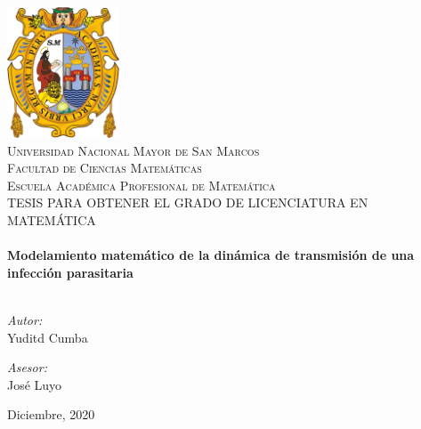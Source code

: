 \begin{titlepage}
\vbox{ }

\vbox{ }

\begin{center}
\includegraphics[width=0.25\textwidth]{img/logoUNMSM.jpg}\\[1cm]
\textsc{\LARGE Universidad Nacional Mayor de San Marcos}\\[1.5cm]
\textsc{\LARGE Facultad de Ciencias Matemáticas}\\[0.5cm]
\textsc{\LARGE Escuela Académica Profesional de Matemática}\\[1.5cm]
\textsc{\Large TESIS PARA OBTENER EL GRADO DE LICENCIATURA EN MATEMÁTICA}\\[0.5cm]

\vbox{ }
\HRule \\[0.4cm]
{ \huge \bfseries Modelamiento matem\'atico de la din\'amica de transmisi\'on de una infecci\'on parasitaria}\\[0.4cm]
\HRule \\[1.5cm]
\begin{minipage}{0.4\textwidth}
\begin{flushleft} \large
\emph{Autor: }\\
Yuditd Cumba
\end{flushleft}
\end{minipage}
\begin{minipage}{0.4\textwidth}
\begin{flushright} \large
\emph{Asesor:} \\
José Luyo
\end{flushright}
\end{minipage}
\vfill
{\large Diciembre, 2020}
\end{center}
\end{titlepage}